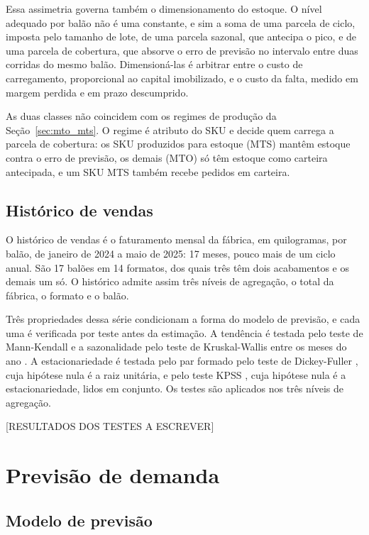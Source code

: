 \documentclass[
    12pt,
    openright,
    oneside,
    a4paper,
    fleqn,
    chapter=TITLE,
    section=TITLE,
    english,
    brazil
]{abntex2}
\begin{document}
Essa assimetria governa também o dimensionamento do estoque. O nível adequado por balão não é uma constante, e sim a soma de uma parcela de ciclo, imposta pelo tamanho de lote, de uma parcela sazonal, que antecipa o pico, e de uma parcela de cobertura, que absorve o erro de previsão no intervalo entre duas corridas do mesmo balão. Dimensioná-las é arbitrar entre o custo de carregamento, proporcional ao capital imobilizado, e o custo da falta, medido em margem perdida e em prazo descumprido.

As duas classes não coincidem com os regimes de produção da Seção~\ref{sec:mto_mts}. O regime é atributo do SKU e decide quem carrega a parcela de cobertura: os SKU produzidos para estoque (MTS) mantêm estoque contra o erro de previsão, os demais (MTO) só têm estoque como carteira antecipada, e um SKU MTS também recebe pedidos em carteira.

\section{Histórico de vendas}
\label{sec:dados_historicos}

O histórico de vendas é o faturamento mensal da fábrica, em quilogramas, por balão, de janeiro de 2024 a maio de 2025: 17 meses, pouco mais de um ciclo anual. São 17 balões em 14 formatos, dos quais três têm dois acabamentos e os demais um só. O histórico admite assim três níveis de agregação, o total da fábrica, o formato e o balão.

Três propriedades dessa série condicionam a forma do modelo de previsão, e cada uma é verificada por teste antes da estimação. A tendência é testada pelo teste de Mann-Kendall \cite{mann1945} e a sazonalidade pelo teste de Kruskal-Wallis entre os meses do ano \cite{kruskalwallis1952}. A estacionariedade é testada pelo par formado pelo teste de Dickey-Fuller \cite{dickeyfuller1979}, cuja hipótese nula é a raiz unitária, e pelo teste KPSS \cite{kwiatkowski1992}, cuja hipótese nula é a estacionariedade, lidos em conjunto. Os testes são aplicados nos três níveis de agregação.

[RESULTADOS DOS TESTES A ESCREVER]


\chapter{Previsão de demanda}
\label{sec:previsao}

\section{Modelo de previsão}
\label{sec:modelo_previsao}
\end{document}
